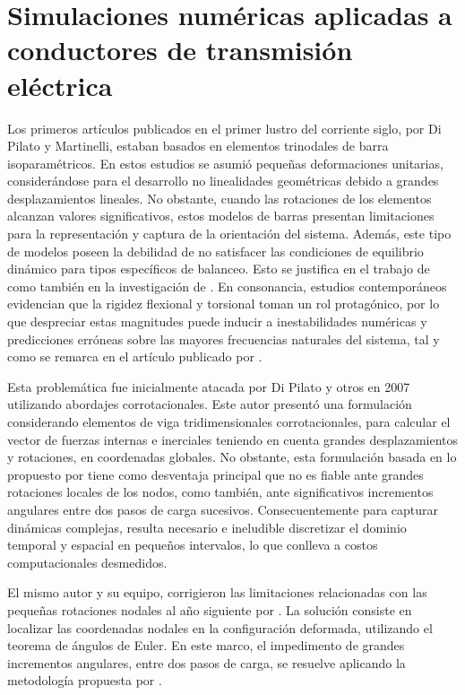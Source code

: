 \section{Simulaciones numéricas aplicadas a conductores de transmisión eléctrica}\label{Sec:EA:AplicadasConductores}
Los primeros artículos publicados en el primer lustro del corriente siglo, por Di Pilato y Martinelli, estaban basados en elementos trinodales de barra isoparamétricos. En estos estudios se asumió pequeñas deformaciones unitarias, considerándose para el desarrollo no linealidades geométricas debido a grandes desplazamientos lineales. No obstante, cuando las rotaciones de los elementos alcanzan valores significativos, estos modelos de barras presentan limitaciones para la representación y captura de la orientación del sistema. Además, este tipo de modelos poseen la debilidad de no satisfacer las condiciones de equilibrio dinámico para tipos específicos de balanceo. Esto se justifica en el trabajo de \cite{martinelli2001numerical} como también en la investigación de \cite{Martinelli2004}. En consonancia, estudios contemporáneos evidencian que la rigidez flexional y torsional toman un rol protagónico, por lo que despreciar estas magnitudes puede inducir a inestabilidades numéricas y predicciones erróneas sobre las mayores frecuencias naturales del sistema, tal y como se remarca en el artículo publicado por \cite{koh2004dynamic}.

Esta problemática fue inicialmente atacada por Di Pilato y otros en 2007 utilizando abordajes corrotacionales. Este autor presentó una formulación considerando elementos de viga tridimensionales corrotacionales, para calcular el vector de fuerzas internas e inerciales teniendo en cuenta grandes desplazamientos y rotaciones, en coordenadas globales. No obstante, esta formulación basada en lo propuesto por \cite{oran1973tangent} tiene como desventaja principal que no es fiable ante grandes rotaciones locales de los nodos, como también, ante significativos incrementos angulares entre dos pasos de carga sucesivos. Consecuentemente para capturar dinámicas complejas, resulta necesario e ineludible discretizar el dominio temporal y espacial en pequeños intervalos, lo que conlleva a costos computacionales desmedidos.

El mismo autor y su equipo, corrigieron las limitaciones relacionadas con las pequeñas rotaciones nodales al año siguiente por \cite{di2008corotational}. La solución consiste en localizar las coordenadas nodales en la configuración deformada, utilizando el teorema de ángulos de Euler. En este marco, el impedimento de grandes incrementos angulares, entre dos pasos de carga, se resuelve aplicando la metodología propuesta por \cite{simo1988dynamics}.  

